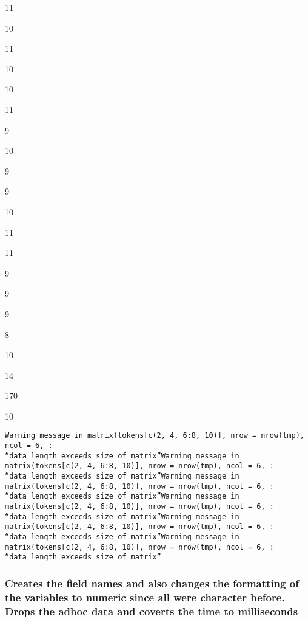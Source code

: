 \documentclass[11pt]{article}
\begin{document}
    
    \begin{enumerate*}
\item 11
\item 10
\end{enumerate*}


    
    \begin{enumerate*}
\item 11
\item 10
\item 10
\item 11
\item 9
\item 10
\item 9
\item 9
\item 10
\item 11
\item 11
\item 9
\item 9
\item 9
\item 8
\item 10
\item 14
\end{enumerate*}


    
    \begin{enumerate*}
\item 170
\item 10
\end{enumerate*}


    
    \begin{Verbatim}[commandchars=\\\{\}]
Warning message in matrix(tokens[c(2, 4, 6:8, 10)], nrow = nrow(tmp), ncol = 6, :
“data length exceeds size of matrix”Warning message in matrix(tokens[c(2, 4, 6:8, 10)], nrow = nrow(tmp), ncol = 6, :
“data length exceeds size of matrix”Warning message in matrix(tokens[c(2, 4, 6:8, 10)], nrow = nrow(tmp), ncol = 6, :
“data length exceeds size of matrix”Warning message in matrix(tokens[c(2, 4, 6:8, 10)], nrow = nrow(tmp), ncol = 6, :
“data length exceeds size of matrix”Warning message in matrix(tokens[c(2, 4, 6:8, 10)], nrow = nrow(tmp), ncol = 6, :
“data length exceeds size of matrix”Warning message in matrix(tokens[c(2, 4, 6:8, 10)], nrow = nrow(tmp), ncol = 6, :
“data length exceeds size of matrix”
    \end{Verbatim}

    \subsubsection{Creates the field names and also changes the formatting
of the variables to numeric since all were character before. Drops the
adhoc data and coverts the time to
milliseconds}\label{creates-the-field-names-and-also-changes-the-formatting-of-the-variables-to-numeric-since-all-were-character-before.-drops-the-adhoc-data-and-coverts-the-time-to-milliseconds}
\end{document}
